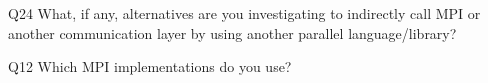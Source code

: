 \begin{description}%
\item{Q24} What, if any, alternatives are you investigating to indirectly call MPI or another communication layer by using another parallel language/library?%
\item{Q12} Which MPI implementations do you use?%
\end{description}%
